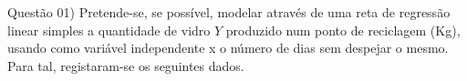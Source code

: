 
\noindent \textcolor{COLOR1}{Questão 01)}  Pretende-se, se possível, modelar através de uma reta de regressão linear simples a quantidade de vidro $Y$ produzido num ponto de reciclagem (Kg), usando como variável independente x o número de dias sem despejar o mesmo. Para tal, registaram-se os seguintes dados.
\\

